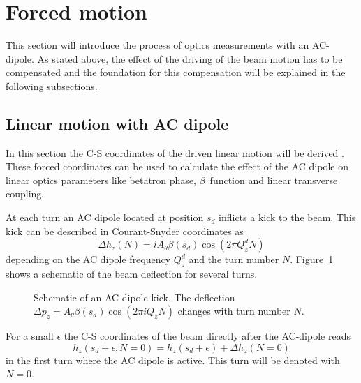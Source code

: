 \section{Forced motion}

This section will introduce the process of optics measurements with an AC-dipole. As stated above,
the effect of the driving of the beam motion has to be compensated and the foundation for this
compensation will be explained in the following subsections.

\subsection{Linear motion with AC dipole}
\newcommand{\Qd}[1]{Q^{d}_{#1}}
\label{sec_driven_coords}

In this section the C-S coordinates of the driven linear motion will be derived \cite{Miyamoto2010,Peggs1998}. These forced coordinates
can be used to calculate the effect of the AC dipole on linear optics parameters like betatron phase, 
$\beta$~function and linear transverse coupling.

At each turn an AC dipole located at position $s_d$ inflicts a kick to the beam. This kick can be
described in Courant-Snyder coordinates as
%
\begin{equation}
    \Delta h_z(N) = i A_\theta\beta(s_d) \cos(2\pi \Qd{z} N)
\end{equation}
%
depending on the AC dipole frequency $\Qd{z}$ and the turn number $N$. Figure~\ref{fig_ac_kick} shows
a schematic of the beam deflection for several turns.
%
\begin{figure}[h]
    \centering
    
    \caption{
        Schematic of an AC-dipole kick. The deflection $\Delta p_z = A_\theta\beta(s_d)\cos(2\pi i Q_z N)$
        changes with turn number $N$.}
    \label{fig_ac_kick}
\end{figure}
%
For a small $\epsilon$ the C-S coordinates of the beam directly after the AC-dipole reads
%
\begin{equation}
    h_z(s_d + \epsilon, N=0) = h_z(s_d+\epsilon) + \Delta h_z(N=0)
    \label{eq_ackick}
\end{equation}
%
in the first turn where the AC dipole is active. This turn will be denoted with $N=0$.

